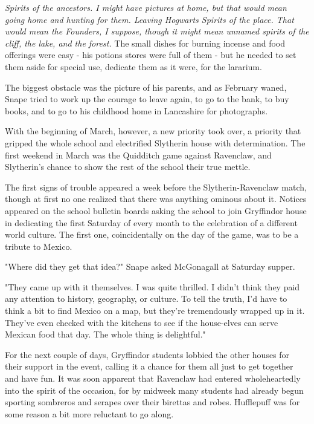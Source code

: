 \emph{Spirits of the ancestors. I might have pictures at home, but that would mean going home and hunting for them. Leaving Hogwarts{\el} Spirits of the place. That would mean the Founders, I suppose, though it might mean unnamed spirits of the cliff, the lake, and the forest.} The small dishes for burning incense and food offerings were easy - his potions stores were full of them - but he needed to set them aside for special use, dedicate them as it were, for the lararium.

The biggest obstacle was the picture of his parents, and as February waned, Snape tried to work up the courage to leave again, to go to the bank, to buy books, and to go to his childhood home in Lancashire for photographs.

With the beginning of March, however, a new priority took over, a priority that gripped the whole school and electrified Slytherin house with determination. The first weekend in March was the Quidditch game against Ravenclaw, and Slytherin's chance to show the rest of the school their true mettle.

The first signs of trouble appeared a week before the Slytherin-Ravenclaw match, though at first no one realized that there was anything ominous about it. Notices appeared on the school bulletin boards asking the school to join Gryffindor house in dedicating the first Saturday of every month to the celebration of a different world culture. The first one, coincidentally on the day of the game, was to be a tribute to Mexico.

"Where did they get that idea?" Snape asked McGonagall at Saturday supper.

"They came up with it themselves. I was quite thrilled. I didn't think they paid any attention to history, geography, or culture. To tell the truth, I'd have to think a bit to find Mexico on a map, but they're tremendously wrapped up in it. They've even checked with the kitchens to see if the house-elves can serve Mexican food that day. The whole thing is delightful."

For the next couple of days, Gryffindor students lobbied the other houses for their support in the event, calling it a chance for them all just to get together and have fun. It was soon apparent that Ravenclaw had entered wholeheartedly into the spirit of the occasion, for by midweek many students had already begun sporting sombreros and serapes over their birettas and robes. Hufflepuff was for some reason a bit more reluctant to go along.

